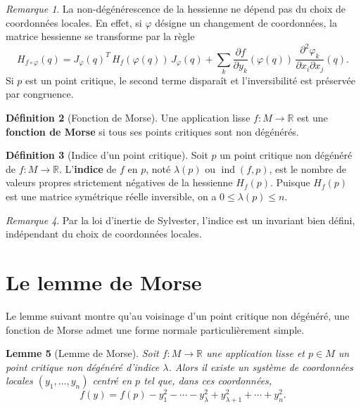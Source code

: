 \documentclass[12pt,a4paper,openany]{book}
\theoremstyle{definition}
\newtheorem{definition}{Définition}[chapter]
\theoremstyle{plain}
\newtheorem{lemme}[definition]{Lemme}
\theoremstyle{remark}
\newtheorem{remarque}[definition]{Remarque}
\newcommand{\R}{\mathbb{R}}
\begin{document}
\begin{remarque}
La non-dégénérescence de la hessienne ne dépend pas du choix de coordonnées
locales. En effet, si $\varphi$ désigne un changement de coordonnées, la matrice
hessienne se transforme par la règle
\[
  H_{f \circ \varphi}(q) = J_\varphi(q)^T \, H_f(\varphi(q)) \, J_\varphi(q)
  + \sum_k \frac{\partial f}{\partial y_k}(\varphi(q)) \, \frac{\partial^2 \varphi_k}{\partial x_i \partial x_j}(q).
\]
Si $p$ est un point critique, le second terme disparaît et l'inversibilité est
préservée par congruence.
\end{remarque}

\begin{definition}[Fonction de Morse]\label{def:fonction-morse}
Une application lisse $f : M \to \R$ est une \textbf{fonction de Morse} si tous
ses points critiques sont non dégénérés.
\end{definition}

\begin{definition}[Indice d'un point critique]\label{def:indice-morse}
Soit $p$ un point critique non dégénéré de $f : M \to \R$. L'\textbf{indice} de
$f$ en $p$, noté $\lambda(p)$ ou $\operatorname{ind}(f, p)$, est le nombre de
valeurs propres strictement négatives de la hessienne $H_f(p)$. Puisque
$H_f(p)$ est une matrice symétrique réelle inversible, on a
$0 \leqslant \lambda(p) \leqslant n$.
\end{definition}

\begin{remarque}
Par la loi d'inertie de Sylvester, l'indice
est un invariant bien défini, indépendant du choix de coordonnées locales.
\end{remarque}

\section{Le lemme de Morse}\label{sec:lemme-morse}

Le lemme suivant montre qu'au voisinage d'un point critique non dégénéré, une
fonction de Morse admet une forme normale particulièrement simple.

\begin{lemme}[Lemme de Morse]\label{lem:morse}
Soit $f : M \to \R$ une application lisse et $p \in M$ un point critique non
dégénéré d'indice $\lambda$. Alors il existe un système de coordonnées locales
$(y_1, \ldots, y_n)$ centré en $p$ tel que, dans ces coordonnées,
\[
  f(y) = f(p) - y_1^2 - \cdots - y_\lambda^2 + y_{\lambda+1}^2 + \cdots + y_n^2.
\]
\end{lemme}
\end{document}
